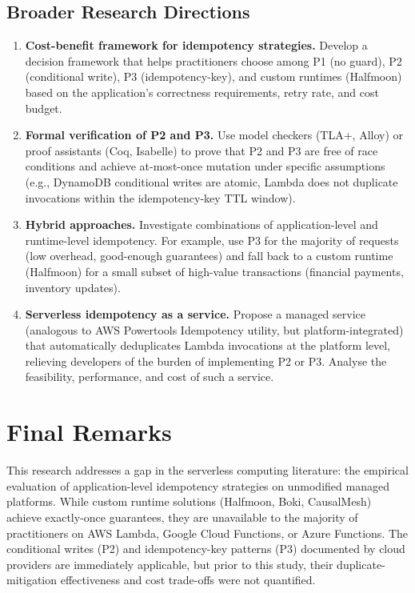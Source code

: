 \subsection{Broader Research Directions}

\begin{enumerate}
    \item \textbf{Cost-benefit framework for idempotency strategies.} Develop a decision framework that helps practitioners choose among P1 (no guard), P2 (conditional write), P3 (idempotency-key), and custom runtimes (Halfmoon) based on the application's correctness requirements, retry rate, and cost budget.
    
    \item \textbf{Formal verification of P2 and P3.} Use model checkers (TLA+, Alloy) or proof assistants (Coq, Isabelle) to prove that P2 and P3 are free of race conditions and achieve at-most-once mutation under specific assumptions (e.g., DynamoDB conditional writes are atomic, Lambda does not duplicate invocations within the idempotency-key TTL window).
    
    \item \textbf{Hybrid approaches.} Investigate combinations of application-level and runtime-level idempotency. For example, use P3 for the majority of requests (low overhead, good-enough guarantees) and fall back to a custom runtime (Halfmoon) for a small subset of high-value transactions (financial payments, inventory updates).
    
    \item \textbf{Serverless idempotency as a service.} Propose a managed service (analogous to AWS Powertools Idempotency utility, but platform-integrated) that automatically deduplicates Lambda invocations at the platform level, relieving developers of the burden of implementing P2 or P3. Analyse the feasibility, performance, and cost of such a service.
\end{enumerate}

\section{Final Remarks}

This research addresses a gap in the serverless computing literature: the empirical evaluation of application-level idempotency strategies on unmodified managed platforms. While custom runtime solutions (Halfmoon, Boki, CausalMesh) achieve exactly-once guarantees, they are unavailable to the majority of practitioners on AWS Lambda, Google Cloud Functions, or Azure Functions. The conditional writes (P2) and idempotency-key patterns (P3) documented by cloud providers are immediately applicable, but prior to this study, their duplicate-mitigation effectiveness and cost trade-offs were not quantified.

